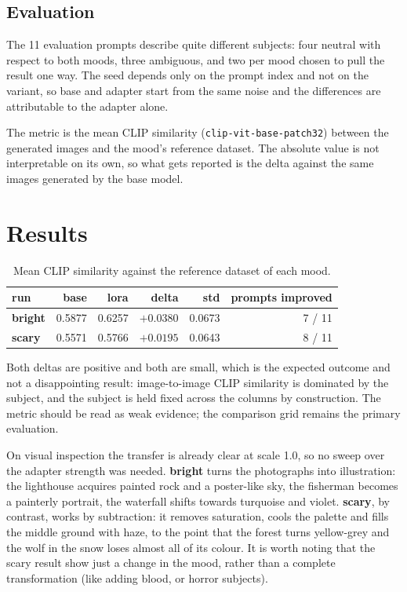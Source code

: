 \documentclass[11pt,a4paper]{article}
\newcommand{\bright}{\textcolor{brightHue}{\textbf{bright}}}
\newcommand{\scary}{\textcolor{scaryHue}{\textbf{scary}}}
\begin{document}
\subsection{Evaluation}

The 11 evaluation prompts describe quite different subjects: four neutral with respect
to both moods, three ambiguous, and two per mood chosen to pull the result one way. The seed
depends only on the prompt index and not on the variant, so base and adapter start from the same
noise and the differences are attributable to the adapter alone.

The metric is the mean CLIP similarity (\texttt{clip-vit-base-patch32}) between the generated
images and the mood's reference dataset. The absolute value is not interpretable on its own, so
what gets reported is the delta against the same images generated by the base model.

\section{Results}

\begin{table}[h]
\centering
\begin{tabular}{lrrrrr}
\toprule
run & base & lora & delta & std & prompts improved \\
\midrule
\bright & 0.5877 & 0.6257 & $+0.0380$ & 0.0673 & 7 / 11 \\
\scary  & 0.5571 & 0.5766 & $+0.0195$ & 0.0643 & 8 / 11 \\
\bottomrule
\end{tabular}
\caption{Mean CLIP similarity against the reference dataset of each mood.}
\end{table}

Both deltas are positive and both are small, which is the expected outcome and not a disappointing
result: image-to-image CLIP similarity is dominated by the subject, and the subject is held fixed
across the columns by construction. The metric should be read as weak evidence; the comparison
grid remains the primary evaluation.

On visual inspection the transfer is already clear at scale 1.0, so no sweep over the adapter
strength was needed. \bright{} turns the photographs into illustration: the lighthouse acquires
painted rock and a poster-like sky, the fisherman becomes a painterly portrait, the waterfall
shifts towards turquoise and violet. \scary{}, by contrast, works by subtraction: it removes
saturation, cools the palette and fills the middle ground with haze, to the point that the forest
turns yellow-grey and the wolf in the snow loses almost all of its colour. It is worth noting that
the scary result show just a change in the mood, rather than a complete transformation (like adding blood, or horror subjects).
\end{document}
